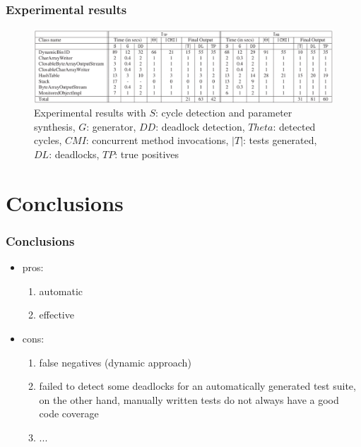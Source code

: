 \documentclass{beamer}
\begin{document}
\begin{frame}
\frametitle{Experimental results}
\begin{figure}[ht!]
    \includegraphics[scale = 0.3]{Images/er2}
    \caption{%
        Experimental results with $S$: cycle detection and parameter synthesis, $G$: generator, $DD$: deadlock detection, $Theta$: detected cycles,
        $CMI$: concurrent method invocations, $|T|$: tests generated, $DL$: deadlocks, $TP$: true positives
     }%
\end{figure}
\end{frame}

\section{Conclusions}
\begin{frame}
\frametitle{Conclusions}

    \begin{itemize}
    \item pros:
    \begin{enumerate}
      \item automatic
      \item effective
    \end{enumerate}
    \item cons:
    \begin{enumerate}
      \item false negatives (dynamic approach)
      \item failed to detect some deadlocks for an automatically generated test suite, on the other hand, manually written tests do not always have a good code coverage
      \item ...
    \end{enumerate}
    \end{itemize}

\end{frame}



\end{document}
